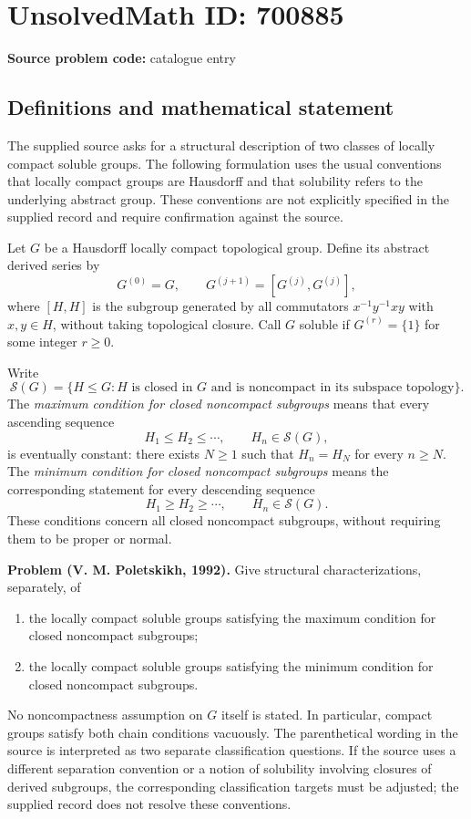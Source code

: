 \documentclass[11pt]{article}
\begin{document}
\section*{UnsolvedMath ID: 700885}
\textbf{Source problem code:} catalogue entry
\subsection{Definitions and mathematical statement}
The supplied source asks for a structural description of two classes of locally compact soluble groups. The following formulation uses the usual conventions that locally compact groups are Hausdorff and that solubility refers to the underlying abstract group. These conventions are not explicitly specified in the supplied record and require confirmation against the source.

Let \(G\) be a Hausdorff locally compact topological group. Define its abstract derived series by
\[
G^{(0)}=G,\qquad G^{(j+1)}=[G^{(j)},G^{(j)}],
\]
where \([H,H]\) is the subgroup generated by all commutators \(x^{-1}y^{-1}xy\) with \(x,y\in H\), without taking topological closure. Call \(G\) soluble if \(G^{(r)}=\{1\}\) for some integer \(r\geq 0\).

Write
\[
\mathcal{S}(G)=\{H\leq G: H\text{ is closed in }G\text{ and is noncompact in its subspace topology}\}.
\]
The \emph{maximum condition for closed noncompact subgroups} means that every ascending sequence
\[
H_1\leq H_2\leq\cdots,\qquad H_n\in\mathcal{S}(G),
\]
is eventually constant: there exists \(N\geq 1\) such that \(H_n=H_N\) for every \(n\geq N\). The \emph{minimum condition for closed noncompact subgroups} means the corresponding statement for every descending sequence
\[
H_1\geq H_2\geq\cdots,\qquad H_n\in\mathcal{S}(G).
\]
These conditions concern all closed noncompact subgroups, without requiring them to be proper or normal.

\textbf{Problem (V. M. Poletskikh, 1992).} Give structural characterizations, separately, of
\begin{enumerate}
\item the locally compact soluble groups satisfying the maximum condition for closed noncompact subgroups;
\item the locally compact soluble groups satisfying the minimum condition for closed noncompact subgroups.
\end{enumerate}
No noncompactness assumption on \(G\) itself is stated. In particular, compact groups satisfy both chain conditions vacuously. The parenthetical wording in the source is interpreted as two separate classification questions. If the source uses a different separation convention or a notion of solubility involving closures of derived subgroups, the corresponding classification targets must be adjusted; the supplied record does not resolve these conventions.
\end{document}
